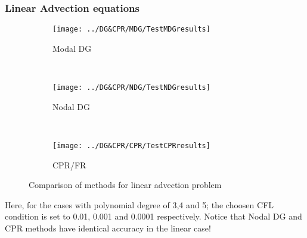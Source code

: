 \begin{frame} \frametitle{Linear Advection equations}
	\begin{figure}
        \centering
        \begin{subfigure}[b]{0.31\textwidth}
                \centering
                \texttt{[image: ../DG\&CPR/MDG/TestMDGresults]}
                \caption{Modal DG}
                \label{fig:TestMDGresults}
        \end{subfigure}%
				~
        \begin{subfigure}[b]{0.31\textwidth}
                \centering
                \texttt{[image: ../DG\&CPR/NDG/TestNDGresults]}
                \caption{Nodal DG}
                \label{fig:TestNDGresults}
        \end{subfigure}
				~
        \begin{subfigure}[b]{0.31\textwidth}
								\centering
                \texttt{[image: ../DG\&CPR/CPR/TestCPRresults]}
                \caption{CPR/FR}
                \label{fig:TestCPRresults}
        \end{subfigure}
				\caption{Comparison of methods for linear advection problem}
				\label{fig:compareLinearAdvection_p3p4p5}
	\end{figure}
	Here, for the cases with polynomial degree of 3,4 and 5; the choosen CFL condition is set to 0.01, 0.001 and 0.0001 respectively.
	Notice that Nodal DG and CPR methods have identical accuracy in the linear case!
\end{frame}

